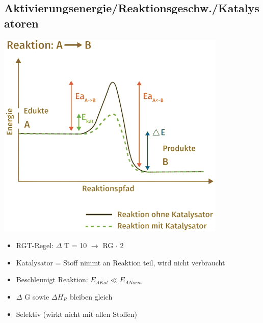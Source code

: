 \subsection{Aktivierungsenergie/Reaktionsgeschw./Katalysatoren}
\begin{minipage}[t]{0.3\linewidth}
    \vspace*{0pt}
    \includegraphics[width=\linewidth]{pictures/Katalysator.png}
\end{minipage}
\begin{minipage}[t]{0.7\linewidth}
\begin{itemize}
    \item RGT-Regel: $\Delta$ T = 10 $\rightarrow$ RG $\cdot$ 2
    \item Katalysator = Stoff nimmt an Reaktion teil, wird nicht verbraucht 
    \item Beschleunigt Reaktion: $E_{AKat} \ll E_{ANorm}$
    \item $\Delta$ G sowie $\Delta H_R$ bleiben gleich
    \item Selektiv (wirkt nicht mit allen Stoffen)
\end{itemize}
\end{minipage}
